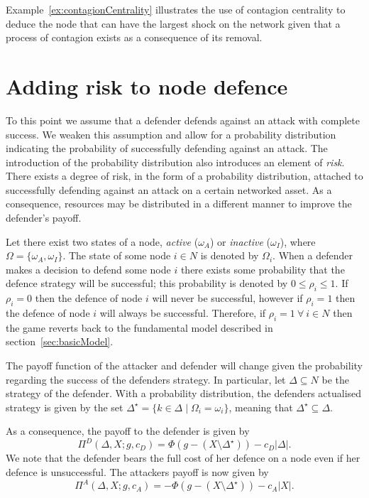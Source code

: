 \documentclass[11pt,fleqn]{article}
\begin{document}
Example~\ref{ex:contagionCentrality} illustrates the use of contagion centrality to deduce the node that can have the largest shock on the network given that a process of contagion exists as a consequence of its removal.

\section{Adding risk to node defence}

To this point we assume that a defender defends against an attack with complete success. We weaken this assumption and allow for a probability distribution indicating the probability of successfully defending against an attack. The introduction of the probability distribution also introduces an element of \emph{risk}. There exists a degree of risk, in the form of a probability distribution, attached to successfully defending against an attack on a certain networked asset. As a consequence, resources may be distributed in a different manner to improve the defender's payoff.

Let there exist two states of a node, \emph{active} ($\omega_{A}$) or \emph{inactive} ($\omega_{I}$), where $\Omega = \{ \omega_{A}, \omega_{I} \}$. The state of some node $i \in N$ is denoted by $\Omega_{i}$. When a defender makes a decision to defend some node $i$ there exists some probability that the defence strategy will be successful; this probability is denoted by $0 \leq \rho_{i} \leq 1$. If $\rho_{i} = 0$ then the defence of node $i$ will never be successful, however if $\rho_{i} = 1$ then the defence of node $i$ will always be successful. Therefore, if $\rho_{i} = 1 ~ \forall ~ i \in N$ then the game reverts back to the fundamental model described in section~\ref{sec:basicModel}.

The payoff function of the attacker and defender will change given the probability regarding the success of the defenders strategy. In particular, let $\Delta \subseteq N$ be the strategy of the defender. With a probability distribution, the defenders actualised strategy is given by the set $\Delta^{\star} = \{ k \in \Delta \mid \Omega_{i} = \omega_{i} \}$, meaning that $\Delta^{\star} \subseteq \Delta$. 

As a consequence, the payoff to the defender is given by
\begin{equation}
  \Pi^{D}(\Delta, X; g, c_{D}) = \Phi(g - (X \setminus \Delta^{\star})) - c_{D} |\Delta| .
\end{equation}
We note that the defender bears the full cost of her defence on a node even if her defence is unsuccessful. The attackers payoff is now given by
\begin{equation}
  \Pi^{A}(\Delta, X; g, c_{A}) = - \Phi(g - (X \setminus \Delta^{\star})) - c_{A} |X|.
\end{equation}
\end{document}
